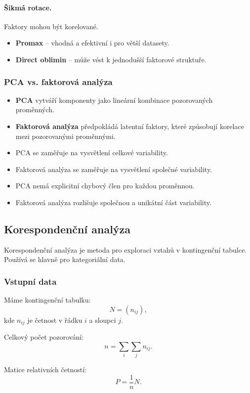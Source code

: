 \paragraph{Šikmá rotace.}
Faktory mohou být korelované.
\begin{itemize}
    \item \textbf{Promax} -- vhodná a efektivní i pro větší datasety.
    \item \textbf{Direct oblimin} -- může vést k jednodušší faktorové struktuře.
\end{itemize}

\subsubsection{PCA vs. faktorová analýza}

\begin{itemize}
    \item \textbf{PCA} vytváří komponenty jako lineární kombinace pozorovaných proměnných.
    \item \textbf{Faktorová analýza} předpokládá latentní faktory, které způsobují korelace mezi
    pozorovanými proměnnými.
    \item PCA se zaměřuje na vysvětlení celkové variability.
    \item Faktorová analýza se zaměřuje na vysvětlení společné variability.
    \item PCA nemá explicitní chybový člen pro každou proměnnou.
    \item Faktorová analýza rozlišuje společnou a unikátní část variability.
\end{itemize}

\subsection{Korespondenční analýza}

Korespondenční analýza je metoda pro exploraci vztahů v kontingenční tabulce. Používá se hlavně
pro kategoriální data.

\subsubsection{Vstupní data}

Máme kontingenční tabulku:
\[
N = (n_{ij}),
\]
kde $n_{ij}$ je četnost v řádku $i$ a sloupci $j$.

Celkový počet pozorování:
\[
n = \sum_i \sum_j n_{ij}.
\]

Matice relativních četností:
\[
P = \frac{1}{n}N.
\]


